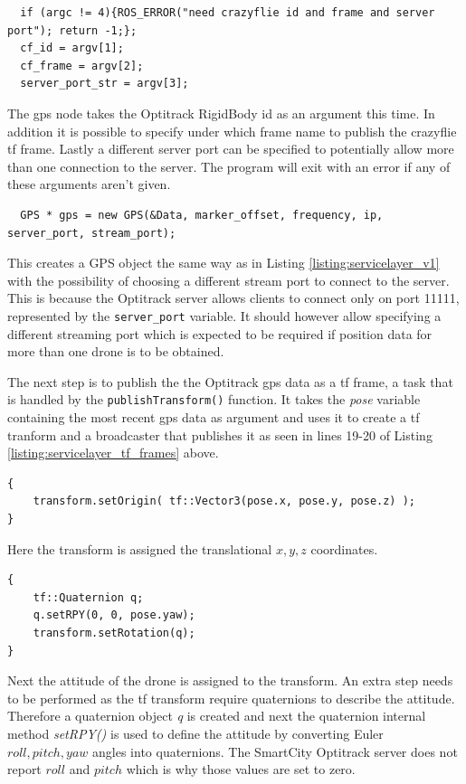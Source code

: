 \begin{verbatim}
  if (argc != 4){ROS_ERROR("need crazyflie id and frame and server port"); return -1;};
  cf_id = argv[1];
  cf_frame = argv[2];
  server_port_str = argv[3];
\end{verbatim}
\noindent The gps node takes the Optitrack RigidBody id as an argument this time. In addition it is possible to specify under which frame name to publish the crazyflie tf frame. Lastly a different server port can be specified to potentially allow more than one connection to the server. The program will exit with an error if any of these arguments aren't given.

\begin{verbatim}
  GPS * gps = new GPS(&Data, marker_offset, frequency, ip, server_port, stream_port);
\end{verbatim}
\noindent This creates a GPS object the same way as in Listing \ref{listing:servicelayer_v1} with the possibility of choosing a different stream port to connect to the server. This is because the Optitrack server allows clients to connect only on port 11111, represented by the \texttt{server\_port} variable. It should however allow specifying a different streaming port which is expected to be required if position data for more than one drone is to be obtained.

The next step is to publish the the Optitrack gps data as a tf frame, a task that is handled by the \texttt{publishTransform()} function. It takes the \textit{pose} variable containing the most recent gps data as argument and uses it to create a tf tranform and a broadcaster that publishes it as seen in lines 19-20 of Listing \ref{listing:servicelayer_tf_frames} above.

\begin{verbatim}
{
    transform.setOrigin( tf::Vector3(pose.x, pose.y, pose.z) );
}
\end{verbatim}
\noindent Here the transform is assigned the translational $x,y,z$ coordinates.

\begin{verbatim}
{
    tf::Quaternion q;
    q.setRPY(0, 0, pose.yaw);
    transform.setRotation(q);
}
\end{verbatim}
\noindent Next the attitude of the drone is assigned to the transform. An extra step needs to be performed as the tf transform require quaternions to describe the attitude. Therefore a quaternion object \textit{q} is created and next the quaternion internal method \textit{setRPY()} is used to define the attitude by converting Euler $roll, pitch, yaw$ angles into quaternions. The SmartCity Optitrack server does not report $roll$ and $pitch$ which is why those values are set to zero.

